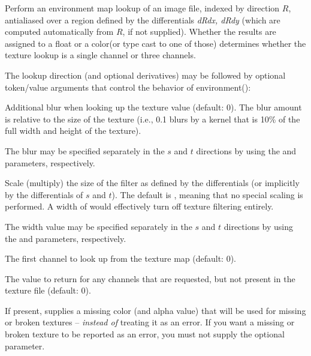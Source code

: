 \documentclass[11pt,letterpaper]{book}
\def\color{{\cf color}\xspace}
\def\float{{\cf float}\xspace}
\begin{document}
Perform an environment map lookup of an image file, indexed by direction
$R$, antialiased over a region defined by the differentials
\emph{dRdx, dRdy} (which are computed
automatically from $R$, if not supplied).  Whether the results
are assigned to a \float or a \color (or type cast to one of those)
determines whether the texture lookup is a single channel or three
channels.

The lookup direction (and optional derivatives) may be followed by optional token/value
arguments that control the behavior of {\cf environment()}:

\vspace{12pt}
Additional blur when looking up the texture value (default: 0).  The
blur amount is relative to the size of the texture (i.e., 0.1 blurs by a
kernel that is 10\% of the full width and height of the texture).

The blur may be specified separately in the $s$ and $t$ directions by
using the  and  parameters, respectively.
\apiend
\vspace{-16pt}

\vspace{12pt}
Scale (multiply) the size of the filter as defined by the differentials
(or implicitly by the differentials of $s$ and $t$).  The default is
{}, meaning that no special scaling is performed.  A width of
{} would effectively turn off texture filtering entirely.

The width value may be specified separately in the $s$ and $t$
directions by using the  and  parameters,
respectively.
\apiend
\vspace{-16pt}

\vspace{12pt}
The first channel to look up from the texture map (default: 0).
\apiend
\vspace{-16pt}

\vspace{12pt}
The value to return for any channels that are requested, but 
not present in the texture file (default: 0).
\apiend
\vspace{-16pt}

\vspace{12pt}
If present, supplies a missing color (and alpha value) that will
be used for missing or broken textures -- \emph{instead of} treating
it as an error.  If you want a missing or broken texture to be reported
as an error, you must not supply the optional 
parameter.
\apiend
\vspace{-16pt}
\end{document}
